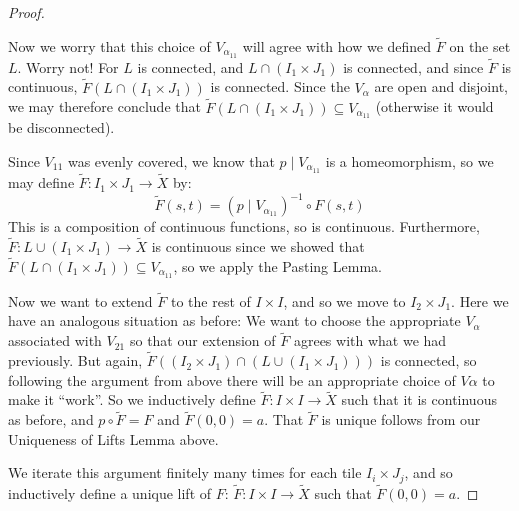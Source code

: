 \begin{proof}
\begin{enumerate}
		Now we worry that this choice of $V_{\alpha_{11}}$ will agree with how we defined $\widetilde{F}$ on the set $L$. Worry not! For $L$ is connected, and $L\cap (I_1\times J_1)$ is connected, and since $\widetilde{F}$ is continuous, $\widetilde{F}(L\cap (I_1\times J_1))$ is connected. Since the $V_\alpha$ are open and disjoint, we may therefore conclude that $\widetilde{F}(L\cap (I_1\times J_1))\subseteq V_{\alpha_{11}}$ (otherwise it would be disconnected).
		
		Since $V_11$ was evenly covered, we know that $p\mid V_{\alpha_{11}}$ is a homeomorphism, so we may define $\widetilde{F}\colon I_1\times J_1\to \widetilde{X}$ by:
		\[ \widetilde{F}(s,t)=(p\mid V_{\alpha_{11}})^{-1}\circ F(s,t) \]
		This is a composition of continuous functions, so is continuous. Furthermore, $\widetilde{F}\colon L\cup (I_1\times J_1)\to \widetilde{X}$ is continuous since we showed that $\widetilde{F}(L\cap (I_1\times J_1))\subseteq V_{\alpha_{11}}$, so we apply the Pasting Lemma.
		
		Now we want to extend $\widetilde{F}$ to the rest of $I\times I$, and so we move to $I_2\times J_1$. Here we have an analogous situation as before: We want to choose the appropriate $V_\alpha$ associated with $V_{21}$ so that our extension of $\widetilde{F}$ agrees with what we had previously. But again, $\widetilde{F}((I_2\times J_1)\cap (L\cup (I_1\times J_1)))$ is connected, so following the argument from above there will be an appropriate choice of $V\alpha$ to make it ``work''. So we inductively define $\widetilde{F}\colon I\times I\to \widetilde{X}$ such that it is continuous as before, and $p\circ \widetilde{F}=F$ and $\widetilde{F}(0,0)=a$. That $\widetilde{F}$ is unique follows from our Uniqueness of Lifts Lemma above. 
	\end{enumerate}
	
	We iterate this argument finitely many times for each tile $I_i\times J_j$, and so inductively define a unique lift of $F$: $\widetilde{F}\colon I\times I\to \widetilde{X}$ such that $\widetilde{F}(0,0)=a$. 
\end{proof}

